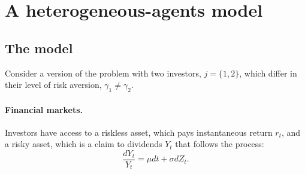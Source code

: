 \documentclass[11pt,english]{article}
\begin{document}





\section{A heterogeneous-agents model}

\subsection{The model}

Consider a version of the problem with two investors, $j = \{1,2\}$, which differ in their level of risk aversion, $\gamma_1 \neq \gamma_2$.

\paragraph{Financial markets.} Investors have access to a riskless asset, which pays instantaneous return $r_t$, and a risky asset, which is a claim to dividends $Y_t$ that follows the process:
\begin{equation}
    \frac{d Y_t}{Y_t} = \mu dt + \sigma d Z_t.
\end{equation}
\end{document}
